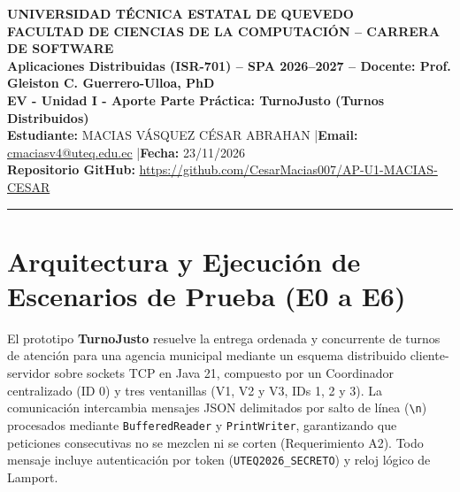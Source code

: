 \documentclass[10pt,a4paper]{article}
\begin{document}
\begin{center}
    {\textbf{\normalsize UNIVERSIDAD TÉCNICA ESTATAL DE QUEVEDO}}\\[0.03cm]
    {\textbf{\small FACULTAD DE CIENCIAS DE LA COMPUTACIÓN -- CARRERA DE SOFTWARE}}\\[0.02cm]
    {\scriptsize \textbf{Aplicaciones Distribuidas (ISR-701) -- SPA 2026--2027 -- Docente: Prof. Gleiston C. Guerrero-Ulloa, PhD}}\\[0.06cm]
    {\textbf{\large EV - Unidad I - Aporte Parte Práctica: TurnoJusto (Turnos Distribuidos)}}\\[0.04cm]
    {\scriptsize \textbf{Estudiante:} MACIAS VÁSQUEZ CÉSAR ABRAHAN \quad|\quad \textbf{Email:} \url{cmaciasv4@uteq.edu.ec} \quad|\quad \textbf{Fecha:} 23/11/2026}\\[0.02cm]
    {\scriptsize \textbf{Repositorio GitHub:} \url{https://github.com/CesarMacias007/AP-U1-MACIAS-CESAR}}
\end{center}
\vspace{-0.25cm}
\hrule
\vspace{0.12cm}

\section{Arquitectura y Ejecución de Escenarios de Prueba (E0 a E6)}

El prototipo \textbf{TurnoJusto} resuelve la entrega ordenada y concurrente de turnos de atención para una agencia municipal mediante un esquema distribuido cliente-servidor sobre sockets TCP en Java 21, compuesto por un Coordinador centralizado (ID 0) y tres ventanillas (V1, V2 y V3, IDs 1, 2 y 3). La comunicación intercambia mensajes JSON delimitados por salto de línea (\texttt{\textbackslash n}) procesados mediante \texttt{BufferedReader} y \texttt{PrintWriter}, garantizando que peticiones consecutivas no se mezclen ni se corten (Requerimiento A2). Todo mensaje incluye autenticación por token (\texttt{UTEQ2026\_SECRETO}) y reloj lógico de Lamport.
\end{document}
